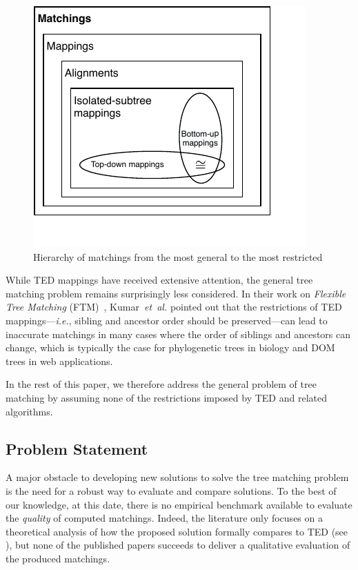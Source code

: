 \documentclass{vldb}
\begin{document}
\begin{figure}
    \centering
    \includegraphics{explanation/hierarchy_matching.pdf}
    \caption{Hierarchy of matchings from the most general to the most restricted}
    \label{fig:hierarchy_matching}
\end{figure}

While TED mappings have received extensive attention, the general tree matching problem remains surprisingly less considered.
In their work on \emph{Flexible Tree Matching} (FTM)~\cite{Kumar2011_FTM}, Kumar~\emph{et~al.} pointed out that the restrictions of TED mappings---\emph{i.e.}, sibling and ancestor order should be preserved---can lead to inaccurate matchings in many cases where the order of siblings and ancestors can change, which is typically the case for phylogenetic trees in biology and DOM trees in web applications.

In the rest of this paper, we therefore address the general problem of tree matching by assuming none of the restrictions imposed by TED and related algorithms.

\subsection{Problem Statement}
A major obstacle to developing new solutions to solve the tree matching problem is the need for a robust way to evaluate and compare solutions.
To the best of our knowledge, at this date, there is no empirical benchmark available to evaluate the \emph{quality} of computed matchings.
Indeed, the literature only focuses on a theoretical analysis of how the proposed solution formally compares to TED (see ), but none of the published papers succeeds to deliver a qualitative evaluation of the produced matchings.
\end{document}
